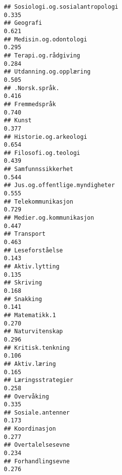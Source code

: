 \documentclass[
]{article}
\begin{document}
\begin{verbatim}
## Sosiologi.og.sosialantropologi                                                   0.335
## Geografi                                                                         0.621
## Medisin.og.odontologi                                                            0.295
## Terapi.og.rådgiving                                                              0.284
## Utdanning.og.opplæring                                                           0.505
## .Norsk.språk.                                                                    0.416
## Fremmedspråk                                                                     0.740
## Kunst                                                                            0.377
## Historie.og.arkeologi                                                            0.654
## Filosofi.og.teologi                                                              0.439
## Samfunnssikkerhet                                                                0.544
## Jus.og.offentlige.myndigheter                                                    0.555
## Telekommunikasjon                                                                0.729
## Medier.og.kommunikasjon                                                          0.447
## Transport                                                                        0.463
## Leseforståelse                                                                   0.143
## Aktiv.lytting                                                                    0.135
## Skriving                                                                         0.168
## Snakking                                                                         0.141
## Matematikk.1                                                                     0.270
## Naturvitenskap                                                                   0.296
## Kritisk.tenkning                                                                 0.106
## Aktiv.læring                                                                     0.165
## Læringsstrategier                                                                0.258
## Overvåking                                                                       0.335
## Sosiale.antenner                                                                 0.173
## Koordinasjon                                                                     0.277
## Overtalelsesevne                                                                 0.234
## Forhandlingsevne                                                                 0.276

\end{verbatim}
\end{document}
